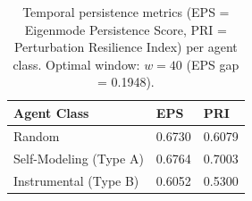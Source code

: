 \begin{table}[t]
\centering
\caption{Temporal persistence metrics (EPS = Eigenmode Persistence Score,
PRI = Perturbation Resilience Index) per agent class.
Optimal window: $w=40$ (EPS gap = 0.1948).}
\label{tab:temporal}
\begin{tabular}{lll}
\toprule
Agent Class & EPS & PRI \\
\midrule
Random & 0.6730 & 0.6079 \\
Self-Modeling (Type A) & 0.6764 & 0.7003 \\
Instrumental (Type B) & 0.6052 & 0.5300 \\
\bottomrule
\end{tabular}
\end{table}
